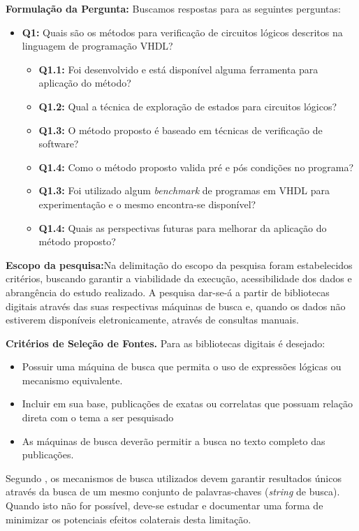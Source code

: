 \par
\textbf{Formulação da Pergunta:} Buscamos respostas para as seguintes perguntas:
\begin{itemize}
\item \textbf{Q1:} Quais são os métodos para verificação de circuitos lógicos descritos na linguagem de programação VHDL?
	\begin{itemize}
	\item \textbf{Q1.1:} Foi desenvolvido e está disponível alguma ferramenta para aplicação do método?
	\item \textbf{Q1.2:} Qual a técnica de exploração de estados para circuitos lógicos?
	\item \textbf{Q1.3:} O método proposto é baseado em técnicas de verificação de software?
	\item \textbf{Q1.4:} Como o método proposto valida pré e pós condições no programa?
	\item \textbf{Q1.3:} Foi utilizado algum \textit{benchmark} de programas em VHDL para experimentação e o mesmo encontra-se disponível?
	\item \textbf{Q1.4:} Quais as perspectivas futuras para melhorar da aplicação do método proposto?
	\end{itemize}
\end{itemize}

\par
\textbf{Escopo da pesquisa:}Na delimitação do escopo da pesquisa foram estabelecidos critérios, buscando garantir a viabilidade da execução, acessibilidade dos dados e abrangência do estudo realizado. A pesquisa dar-se-á a partir de bibliotecas digitais através das suas respectivas máquinas de busca e, quando os dados não estiverem disponíveis eletronicamente, através de consultas manuais.

\par
\textbf{Critérios de Seleção de Fontes.} Para as bibliotecas digitais é desejado:
\begin{itemize}
  \item Possuir uma máquina de busca que permita o uso de expressões lógicas ou mecanismo equivalente.
  \item Incluir em sua base, publicações de exatas ou correlatas que possuam relação direta com o tema a ser pesquisado
  \item As máquinas de busca deverão permitir a busca no texto completo das publicações.
\end{itemize}

Segundo , os mecanismos de busca utilizados devem garantir resultados únicos através da busca de um mesmo conjunto de palavras-chaves (\textit{string} de busca). Quando isto não for possível, deve-se estudar e documentar uma forma de minimizar os potenciais efeitos colaterais desta limitação.


